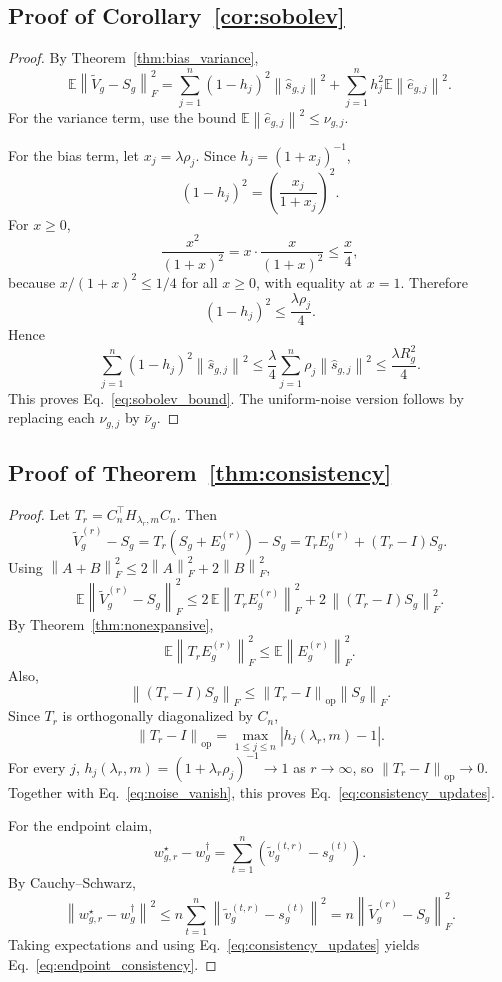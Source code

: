 \documentclass{article}
\newcommand{\EE}{\mathbb{E}}
\newcommand{\norm}[1]{\left\lVert #1 \right\rVert}
\newcommand{\abs}[1]{\left\lvert #1 \right\rvert}
\newcommand{\paren}[1]{\left( #1 \right)}
\begin{document}
\subsection{Proof of Corollary~\ref{cor:sobolev}}

\begin{proof}
By Theorem~\ref{thm:bias_variance},
\[
\EE \norm{\widetilde V_g - S_g}_F^2
=
\sum_{j=1}^{n}(1-h_j)^2\norm{\widehat s_{g,j}}^2
+
\sum_{j=1}^{n} h_j^2 \EE\norm{\widehat e_{g,j}}^2.
\]
For the variance term, use the bound \(\EE\norm{\widehat e_{g,j}}^2 \le \nu_{g,j}\).

For the bias term, let \(x_j=\lambda \rho_j\). Since \(h_j=(1+x_j)^{-1}\),
\[
(1-h_j)^2
=
\left( \frac{x_j}{1+x_j} \right)^2.
\]
For \(x\ge 0\),
\[
\frac{x^2}{(1+x)^2}
=
x \cdot \frac{x}{(1+x)^2}
\le
\frac{x}{4},
\]
because \(x/(1+x)^2 \le 1/4\) for all \(x\ge 0\), with equality at \(x=1\). Therefore
\[
(1-h_j)^2 \le \frac{\lambda \rho_j}{4}.
\]
Hence
\[
\sum_{j=1}^{n}(1-h_j)^2\norm{\widehat s_{g,j}}^2
\le
\frac{\lambda}{4}
\sum_{j=1}^{n}\rho_j \norm{\widehat s_{g,j}}^2
\le
\frac{\lambda R_g^2}{4}.
\]
This proves Eq.~\eqref{eq:sobolev_bound}. The uniform-noise version follows by replacing each \(\nu_{g,j}\) by \(\bar\nu_g\).
\end{proof}

\subsection{Proof of Theorem~\ref{thm:consistency}}

\begin{proof}
Let \(T_r = C_n^\top H_{\lambda_r,m} C_n\). Then
\[
\widetilde V_g^{(r)} - S_g
=
T_r(S_g + E_g^{(r)}) - S_g
=
T_r E_g^{(r)} + (T_r-I)S_g.
\]
Using \(\norm{A+B}_F^2 \le 2\norm{A}_F^2 + 2\norm{B}_F^2\),
\[
\EE \norm{\widetilde V_g^{(r)} - S_g}_F^2
\le
2\,\EE \norm{T_r E_g^{(r)}}_F^2
+
2\,\norm{(T_r-I)S_g}_F^2.
\]
By Theorem~\ref{thm:nonexpansive},
\[
\EE \norm{T_r E_g^{(r)}}_F^2
\le
\EE \norm{E_g^{(r)}}_F^2.
\]
Also,
\[
\norm{(T_r-I)S_g}_F
\le
\norm{T_r-I}_{\mathrm{op}} \norm{S_g}_F.
\]
Since \(T_r\) is orthogonally diagonalized by \(C_n\),
\[
\norm{T_r-I}_{\mathrm{op}}
=
\max_{1\le j\le n} \abs{h_j(\lambda_r,m)-1}.
\]
For every \(j\), \(h_j(\lambda_r,m)=(1+\lambda_r\rho_j)^{-1}\to 1\) as \(r\to\infty\), so \(\norm{T_r-I}_{\mathrm{op}}\to 0\). Together with Eq.~\eqref{eq:noise_vanish}, this proves Eq.~\eqref{eq:consistency_updates}.

For the endpoint claim,
\[
w_{g,r}^\star - w_g^\dagger
=
\sum_{t=1}^{n}\paren{\widetilde v_g^{(t,r)} - s_g^{(t)}}.
\]
By Cauchy--Schwarz,
\[
\norm{w_{g,r}^\star - w_g^\dagger}^2
\le
n
\sum_{t=1}^{n}\norm{\widetilde v_g^{(t,r)} - s_g^{(t)}}^2
=
n \norm{\widetilde V_g^{(r)} - S_g}_F^2.
\]
Taking expectations and using Eq.~\eqref{eq:consistency_updates} yields Eq.~\eqref{eq:endpoint_consistency}.
\end{proof}
\end{document}
